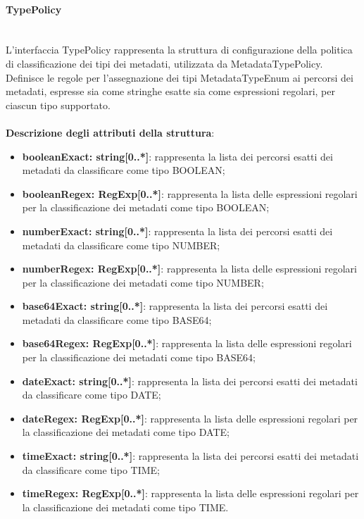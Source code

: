 \documentclass[a4paper,12pt]{article}
\begin{document}
{{{                \paragraph{TypePolicy}\label{par:TypePolicy}\mbox{}\\
                L'interfaccia TypePolicy rappresenta la struttura di configurazione della politica di classificazione dei tipi dei metadati, utilizzata da MetadataTypePolicy. Definisce le regole per l'assegnazione dei tipi MetadataTypeEnum ai percorsi dei metadati, espresse sia come stringhe esatte sia come espressioni regolari, per ciascun tipo supportato.\\
                \\
                \textbf{Descrizione degli attributi della struttura}:
                \begin{itemize}
                    \item \textbf{booleanExact: string[0..*]}: rappresenta la lista dei percorsi esatti dei metadati da classificare come tipo BOOLEAN;
                    \item \textbf{booleanRegex: RegExp[0..*]}: rappresenta la lista delle espressioni regolari per la classificazione dei metadati come tipo BOOLEAN;
                    \item \textbf{numberExact: string[0..*]}: rappresenta la lista dei percorsi esatti dei metadati da classificare come tipo NUMBER;
                    \item \textbf{numberRegex: RegExp[0..*]}: rappresenta la lista delle espressioni regolari per la classificazione dei metadati come tipo NUMBER;
                    \item \textbf{base64Exact: string[0..*]}: rappresenta la lista dei percorsi esatti dei metadati da classificare come tipo BASE64;
                    \item \textbf{base64Regex: RegExp[0..*]}: rappresenta la lista delle espressioni regolari per la classificazione dei metadati come tipo BASE64;
                    \item \textbf{dateExact: string[0..*]}: rappresenta la lista dei percorsi esatti dei metadati da classificare come tipo DATE;
                    \item \textbf{dateRegex: RegExp[0..*]}: rappresenta la lista delle espressioni regolari per la classificazione dei metadati come tipo DATE;
                    \item \textbf{timeExact: string[0..*]}: rappresenta la lista dei percorsi esatti dei metadati da classificare come tipo TIME;
                    \item \textbf{timeRegex: RegExp[0..*]}: rappresenta la lista delle espressioni regolari per la classificazione dei metadati come tipo TIME.
                \end{itemize}
            }

}}
\end{document}
